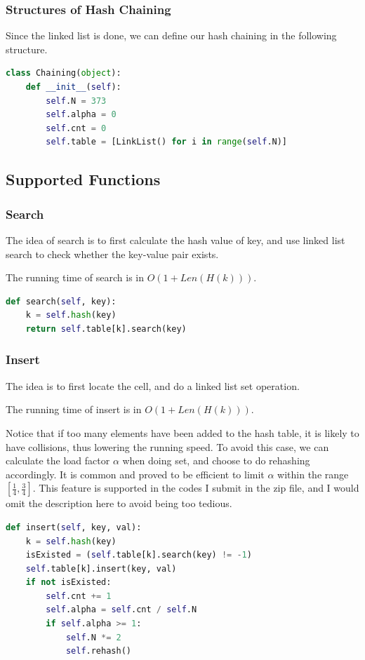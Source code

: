 \documentclass{article}
\begin{document}
\begin{spacing}{1.2}
\subsubsection{Structures of Hash Chaining}
Since the linked list is done, we can define our hash chaining in the following structure.
\begin{lstlisting}[language=Python]
class Chaining(object):
    def __init__(self):
        self.N = 373
        self.alpha = 0
        self.cnt = 0
        self.table = [LinkList() for i in range(self.N)]
\end{lstlisting}

\subsection{Supported Functions}
\subsubsection{Search}
The idea of search is to first calculate the hash value of key, and use linked list search to check whether the key-value pair exists.

The running time of search is in $O(1 + Len(H(k)))$.
\begin{lstlisting}[language=Python]
def search(self, key):
    k = self.hash(key)
    return self.table[k].search(key)
\end{lstlisting}

\subsubsection{Insert}
The idea is to first locate the cell, and do a linked list set operation.

The running time of insert is in $O(1 + Len(H(k)))$.

Notice that if too many elements have been added to the hash table, it is likely to have collisions, thus lowering the running speed. To avoid this case, we can calculate the load factor $\alpha$ when doing set, and choose to do rehashing accordingly. 
It is common and proved to be efficient to limit $\alpha$ within the range $[\frac{1}{4}, \frac{3}{4}]$. This feature is supported in the codes I submit in the zip file, and I would omit the description here to avoid being too tedious.
\begin{lstlisting}[language=Python]
def insert(self, key, val):
    k = self.hash(key)
    isExisted = (self.table[k].search(key) != -1)
    self.table[k].insert(key, val)
    if not isExisted:
        self.cnt += 1
        self.alpha = self.cnt / self.N
        if self.alpha >= 1:
            self.N *= 2
            self.rehash()
\end{lstlisting}


\end{spacing}
\end{document}
